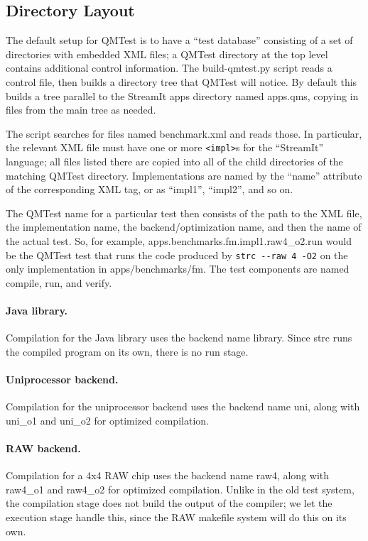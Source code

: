 \documentclass[11pt]{article}
\begin{document}
\subsection{Directory Layout}

The default setup for QMTest is to have a ``test
database'' consisting of a set of directories with embedded XML files;
a \textsf{QMTest} directory at the top level contains additional
control information.  The \textsf{build-qmtest.py} script reads a
control file, then builds a directory tree that QMTest will notice.
By default this builds a tree parallel to the StreamIt \textsf{apps}
directory named \textsf{apps.qms}, copying in files from the main tree
as needed.

The script searches for files named \textsf{benchmark.xml} and reads
those.  In particular, the relevant XML file must have one or more
\verb|<impl>|s for the ``StreamIt'' language; all files listed there
are copied into all of the child directories of the matching QMTest
directory.  Implementations are named by the ``name'' attribute of the
corresponding XML tag, or as ``impl1'', ``impl2'', and so on.

The QMTest name for a particular test then consists of the path to the
XML file, the implementation name, the backend/optimization name, and
then the name of the actual test.  So, for example,
\textsf{apps.benchmarks.fm.impl1.raw4\_o2.run} would be the QMTest test
that runs the code produced by \texttt{strc -{}-raw 4 -O2} on the only
implementation in \textsf{apps/benchmarks/fm}.  The test components
are named \textsf{compile}, \textsf{run}, and \textsf{verify}.

\paragraph{Java library.}  Compilation for the Java library uses the
backend name \textsf{library}.  Since \textsf{strc} runs the compiled
program on its own, there is no \textsf{run} stage.

\paragraph{Uniprocessor backend.}  Compilation for the uniprocessor
backend uses the backend name \textsf{uni}, along with
\textsf{uni\_o1} and \textsf{uni\_o2} for optimized compilation.

\paragraph{RAW backend.}  Compilation for a 4x4 RAW chip uses the
backend name \textsf{raw4}, along with \textsf{raw4\_o1} and
\textsf{raw4\_o2} for optimized compilation.  Unlike in the old test
system, the compilation stage does not build the output of the
compiler; we let the execution stage handle this, since the RAW
makefile system will do this on its own.
\end{document}
